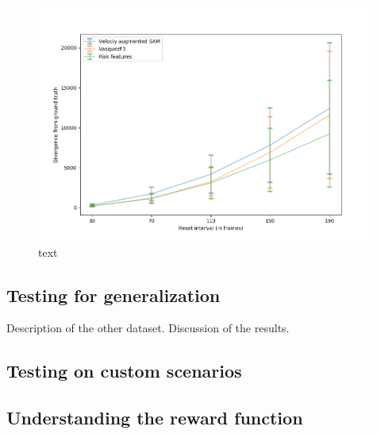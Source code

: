 \begin{figure}[!htbp]
	\centering
	\caption{text}
	\label{feature-rep-comparison-reach-goal}
	\includegraphics[width=0.7\linewidth]{plots/inter_IRL/drift_analysis_irl.png}
\end{figure}




\subsection*{Testing for generalization}
Description of the other dataset.
Discussion of the results.
\subsection*{Testing on custom scenarios}

\subsection*{Understanding the reward function}

